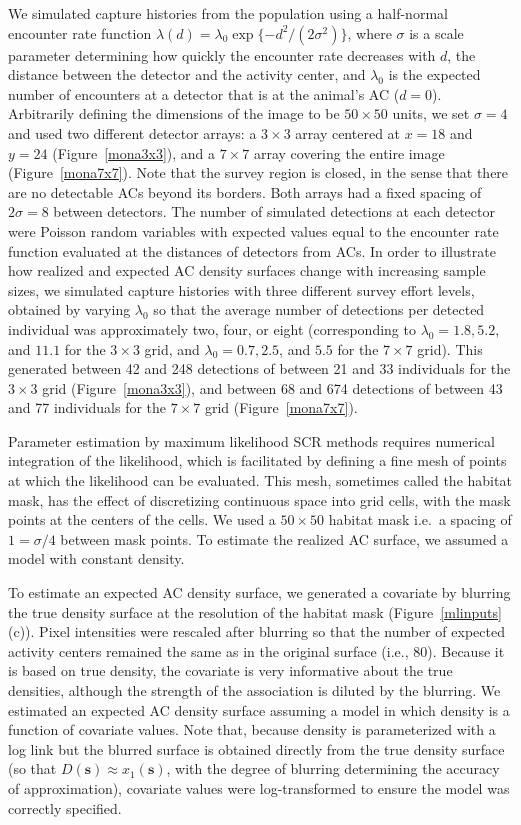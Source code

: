 \documentclass[useAMS,usenatbib,referee]{biom}
\begin{document}
We simulated capture histories from the population using a half-normal encounter rate function $\lambda(d) = \lambda_0\exp\{-d^2/(2\sigma^2)\}$, where $\sigma$ is a scale parameter determining how quickly the encounter rate decreases with $d$, the distance between the detector and the activity center, and $\lambda_0$ is the expected number of encounters at a detector that is at the animal's AC ($d=0$). Arbitrarily defining the dimensions of the image to be $50\times 50$ units, we set $\sigma=4$ and used two different detector arrays: a $3\times3$ array centered at $x=18$ and $y=24$ (Figure~\ref{mona3x3}), and a $7\times 7$ array covering the entire image (Figure~\ref{mona7x7}). Note that the survey region is closed, in the sense that there are no detectable ACs beyond its borders. Both arrays had a fixed spacing of $2\sigma=8$ between detectors. The number of simulated detections at each detector were Poisson random variables with expected values equal to the encounter rate function evaluated at the distances of detectors from ACs. In order to illustrate how realized and expected AC density surfaces change with increasing sample sizes, we simulated capture histories with three different survey effort levels, obtained by varying $\lambda_0$ so that the average number of detections per detected individual was approximately two, four, or eight (corresponding to $\lambda_0=1.8, 5.2$, and $11.1$ for the $3\times 3$ grid, and $\lambda_0=0.7, 2.5$, and $5.5$ for the $7\times 7$ grid). This generated between 42 and 248 detections of between 21 and 33 individuals for the $3\times 3$ grid (Figure~\ref{mona3x3}), and between 68 and 674 detections of between 43 and 77 individuals for the $7\times 7$ grid (Figure~\ref{mona7x7}).

Parameter estimation by maximum likelihood SCR methods requires numerical integration of the likelihood, which is facilitated by defining a fine mesh of points at which the likelihood can be evaluated. This mesh, sometimes called the habitat mask, has the effect of discretizing continuous space into grid cells, with the mask points at the centers of the cells. We used a $50\times 50$ habitat mask i.e.\, a spacing of $1=\sigma/4$ between mask points. To estimate the realized AC surface, we assumed a model with constant density. 

To estimate an expected AC density surface, we generated a covariate by blurring the true density surface at the resolution of the habitat mask (Figure~\ref{mlinputs}(c)). Pixel intensities were rescaled after blurring so that the number of expected activity centers remained the same as in the original surface (i.e., 80). Because it is based on true density, the covariate is very informative about the true densities, although the strength of the association is diluted by the blurring. We estimated an expected AC density surface assuming a model in which density is a function of covariate values. Note that, because density is parameterized with a log link but the blurred surface is obtained directly from the true density surface (so that $D(\mathbf{s})\approx x_1(\mathbf{s})$, with the degree of blurring determining the accuracy of approximation), covariate values were log-transformed to ensure the model was correctly specified.
\end{document}
